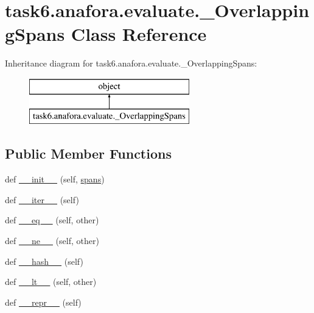 \hypertarget{classtask6_1_1anafora_1_1evaluate_1_1__OverlappingSpans}{}\section{task6.\+anafora.\+evaluate.\+\_\+\+Overlapping\+Spans Class Reference}
\label{classtask6_1_1anafora_1_1evaluate_1_1__OverlappingSpans}
Inheritance diagram for task6.\+anafora.\+evaluate.\+\_\+\+Overlapping\+Spans\+:\begin{figure}[H]
\begin{center}
\leavevmode
\includegraphics[height=2.000000cm]{classtask6_1_1anafora_1_1evaluate_1_1__OverlappingSpans}
\end{center}
\end{figure}
\subsection*{Public Member Functions}
\begin{DoxyCompactItemize}
\item 
def \hyperlink{classtask6_1_1anafora_1_1evaluate_1_1__OverlappingSpans_a08827135aca39491c550979e5e0c01a3}{\+\_\+\+\_\+init\+\_\+\+\_\+} (self, \hyperlink{classtask6_1_1anafora_1_1evaluate_1_1__OverlappingSpans_a35ea422300c32266ef7c6933b17c45bb}{spans})
\item 
def \hyperlink{classtask6_1_1anafora_1_1evaluate_1_1__OverlappingSpans_a785d05d9ab591fd4c8a5c369f2413354}{\+\_\+\+\_\+iter\+\_\+\+\_\+} (self)
\item 
def \hyperlink{classtask6_1_1anafora_1_1evaluate_1_1__OverlappingSpans_a209df9eb71f98789a114ccba1b915374}{\+\_\+\+\_\+eq\+\_\+\+\_\+} (self, other)
\item 
def \hyperlink{classtask6_1_1anafora_1_1evaluate_1_1__OverlappingSpans_abdbce9591e414976c3a8d1d9701b1f21}{\+\_\+\+\_\+ne\+\_\+\+\_\+} (self, other)
\item 
def \hyperlink{classtask6_1_1anafora_1_1evaluate_1_1__OverlappingSpans_a9a7e0ce7f1a05f51982eafc5f8a64321}{\+\_\+\+\_\+hash\+\_\+\+\_\+} (self)
\item 
def \hyperlink{classtask6_1_1anafora_1_1evaluate_1_1__OverlappingSpans_a2a4c519c4c18ef2fa713626d2ca40f8b}{\+\_\+\+\_\+lt\+\_\+\+\_\+} (self, other)
\item 
def \hyperlink{classtask6_1_1anafora_1_1evaluate_1_1__OverlappingSpans_a63b34431e6ce55047a344d756b23f9fa}{\+\_\+\+\_\+repr\+\_\+\+\_\+} (self)
\end{DoxyCompactItemize}
